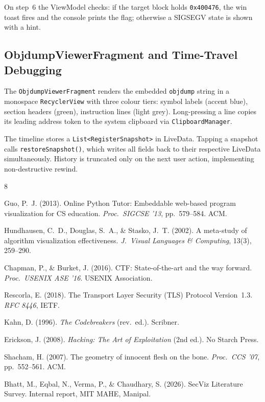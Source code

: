 \documentclass[12pt,a4paper]{article}
\begin{document}
On step~6 the ViewModel checks: if the target block holds \texttt{0x400476},
the win toast fires and the console prints the flag; otherwise a SIGSEGV state
is shown with a hint.

\subsection{ObjdumpViewerFragment and Time-Travel Debugging}

The \texttt{ObjdumpViewerFragment} renders the embedded \texttt{objdump} string in
a monospace \texttt{RecyclerView} with three colour tiers: symbol labels (accent
blue), section headers (green), instruction lines (light grey). Long-pressing a line
copies its leading address token to the system clipboard via
\texttt{ClipboardManager}.

The timeline stores a \texttt{List<RegisterSnapshot>} in LiveData. Tapping a
snapshot calls \texttt{restoreSnapshot()}, which writes all fields back to their
respective LiveData simultaneously. History is truncated only on the next user
action, implementing non-destructive rewind.

\newpage
\begin{thebibliography}{8}

Guo, P.~J. (2013). Online Python Tutor: Embeddable web-based program
visualization for CS education. \textit{Proc.\ SIGCSE '13}, pp.~579--584. ACM.

Hundhausen, C.~D., Douglas, S.~A., \& Stasko, J.~T. (2002). A meta-study of
algorithm visualization effectiveness. \textit{J.\ Visual Languages \& Computing},
13(3), 259--290.

Chapman, P., \& Burket, J. (2016). CTF: State-of-the-art and the way forward.
\textit{Proc.\ USENIX ASE '16}. USENIX Association.

Rescorla, E. (2018). The Transport Layer Security (TLS) Protocol Version~1.3.
\textit{RFC 8446}, IETF.

Kahn, D. (1996). \textit{The Codebreakers} (rev.\ ed.). Scribner.

Erickson, J. (2008). \textit{Hacking: The Art of Exploitation} (2nd ed.).
No Starch Press.

Shacham, H. (2007). The geometry of innocent flesh on the bone. \textit{Proc.\
CCS '07}, pp.~552--561. ACM.

Bhatt, M., Eqbal, N., Verma, P., \& Chaudhary, S. (2026). SecViz Literature
Survey. Internal report, MIT MAHE, Manipal.

\end{thebibliography}
\end{document}
